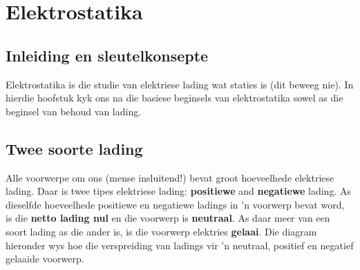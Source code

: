  \chapter{Elektrostatika}
\label{464e844ca5615087ea89d9d95dd9a43a}
 

\section{Inleiding en sleutelkonsepte}
    \nopagebreak
    \label{m38780*cid2}
       
Elektrostatika is die studie van elektriese lading wat staties is (dit beweeg nie). In hierdie hoofstuk kyk ons na die basiese beginsels van elektrostatika sowel as die beginsel van behoud van lading.


\section{Twee soorte lading}
            \nopagebreak

Alle voorwerpe om ons (mense insluitend!) bevat groot hoeveelhede elektriese lading. Daar is twee tipes elektriese lading: \textbf{positiewe} and \textbf{negatiewe} lading. As dieselfde hoeveelhede positiewe en negatiewe ladings in 'n voorwerp bevat word, is die \textbf{netto lading nul} en die voorwerp is \textbf{neutraal}. As daar meer van een soort lading as die ander is, is die voorwerp elektries \textbf{gelaai}. Die diagram hieronder wys hoe die verspreiding van ladings vir 'n neutraal, positief en negatief gelaaide voorwerp. \par

